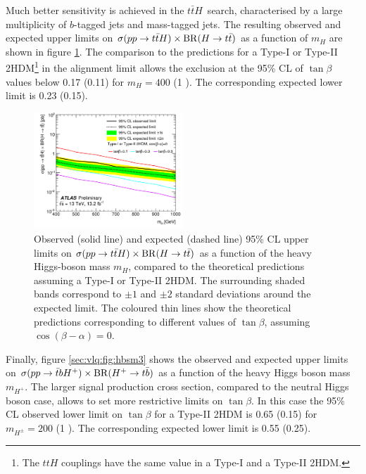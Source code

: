 Much better sensitivity is achieved in the $t\bar{t}H$\ search, characterised by a large multiplicity of $b$-tagged jets and mass-tagged jets.
The resulting observed and expected upper limits on $\sigma(pp \to t\bar{t}H) \times {\rm BR}(H \to t\bar{t})$ as a function of $m_H$
are shown in figure \ref{sec:vlq:fig:hbsm2}. The comparison to the predictions for a Type-I  or Type-II 
2HDM\footnote{The $ttH$ couplings have the same value in a Type-I and a Type-II 2HDM.} in the alignment limit allows the exclusion at the 95\% CL 
of $\tan\beta$ values below 0.17 (0.11) for $m_H = 400$ \gev (1 \tev). The corresponding expected lower limit is 0.23 (0.15).

\begin{figure}[h!]
\centering
\includegraphics[width=0.5\textwidth]{figures/VLQ/fig_22.png}
\captionsetup{width=0.85\textwidth} \caption{\small Observed (solid line) and expected (dashed line) 95\% CL upper limits on $\sigma(pp \to t\bar{t}H) \times {\rm BR}(H \to t\bar{t})$ 
as a function of the heavy Higgs-boson mass $m_H$, compared to the theoretical predictions assuming a Type-I  or Type-II 2HDM.
The surrounding shaded bands correspond to $\pm1$ and $\pm2$ standard deviations around the expected limit. 
The coloured thin lines show the theoretical predictions corresponding to different values of $\tan\beta$, assuming 
$\cos(\beta-\alpha)=0$.}
\label{sec:vlq:fig:hbsm2}
\end{figure}


Finally, figure \ref{sec:vlq:fig:hbsm3} shows the observed and expected upper limits on $\sigma(pp \to \bar{t}bH^+) \times {\rm BR}(H^+ \to t\bar{b})$ 
as a function of the heavy Higgs boson mass $m_{H^+}$. The larger signal production cross section, compared to the neutral Higgs boson case,
allows to set more restrictive limits on $\tan\beta$. In this case the 95\% CL observed lower limit on $\tan\beta$ for a Type-II 2HDM is 0.65 (0.15) for 
$m_{H^{\pm}} = 200$ \gev (1 \tev). The corresponding expected lower limit is 0.55 (0.25).

